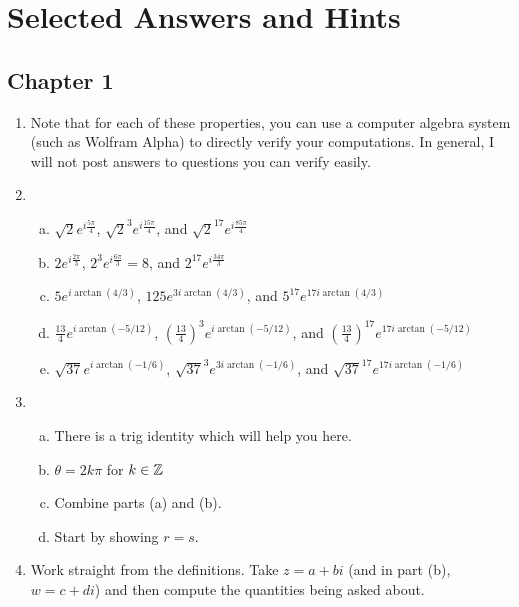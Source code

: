 \chapter{Selected Answers and Hints}

\section{Chapter 1}

\begin{enumerate}

\item Note that for each of these properties, you can use a computer algebra system (such as Wolfram Alpha) to directly verify your computations. In general, I will not post answers to questions you can verify easily.

\item \begin{enumerate}[a)]
\item $\sqrt{2}e^{i\frac{5\pi}{4}}$, $\sqrt{2}^3e^{i\frac{15\pi}{4}}$, and $\sqrt{2}^{17}e^{i\frac{85\pi}{4}}$
\item $2e^{i\frac{2\pi}{3}}$, $2^3e^{i\frac{6\pi}{3}} = 8$, and $2^{17}e^{i\frac{34\pi}{3}}$
\item $5e^{i\arctan(4/3)}$, $125 e^{3i\arctan(4/3)}$, and $5^{17}e^{17i\arctan(4/3)}$
\item $\frac{13}{4}e^{i\arctan(-5/12)}$, $\left(\frac{13}{4}\right)^3e^{i\arctan(-5/12)}$, and $\left(\frac{13}{4}\right)^{17}e^{17i\arctan(-5/12)}$
\item $\sqrt{37}e^{i\arctan(-1/6)}$, $\sqrt{37}^3e^{3i\arctan(-1/6)}$, and $\sqrt{37}^{17}e^{17i\arctan(-1/6)}$

\end{enumerate}

\item

\begin{enumerate}[a)]
\item There is a trig identity which will help you here.
\item $\theta = 2k\pi$ for $k\in\mathbb{Z}$
\item Combine parts (a) and (b).
\item Start by showing $r = s$.
\end{enumerate}

\item Work straight from the definitions. Take $z = a+bi$ (and in part (b), $w = c+di$) and then compute the quantities being asked about.


\end{enumerate}
